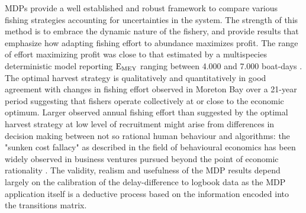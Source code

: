 MDPs provide a well established and robust framework to compare various fishing strategies accounting for uncertainties in the system. The strength of this method is to embrace the dynamic nature of the fishery, and provide results that emphasize how adapting fishing effort to abundance maximizes profit. The range of effort maximizing profit was close to that estimated by a multispecies deterministic model reporting ${\rm E_{MEY}}$ ranging between 4.000 and 7.000 boat-days \citep{NaWang2015a}. The optimal harvest strategy is qualitatively and quantitatively in good agreement with changes in fishing effort observed in Moreton Bay over a 21-year period suggesting that fishers operate collectively at or close to the economic optimum. Larger observed annual fishing effort than suggested by the optimal harvest strategy at low level of recruitment might arise from differences in decision making between not so rational human behaviour and algorithms: the "sunken cost fallacy" as described in the field of behavioural economics has been widely observed in business ventures pursued beyond the point of economic rationality \citep{camerer2011advances}. The validity, realism and usefulness of the MDP results depend largely on the calibration of the delay-difference to logbook data as the MDP application itself is a deductive process based on the information encoded into the transitions matrix. \\



